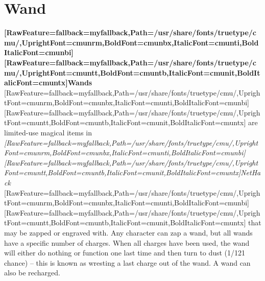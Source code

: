 \chapter{Wand}

{\bfseries \allowbreak{}\setmainfont{cmunbx.ttf}[RawFeature={fallback=myfallback},Path=/usr/share/fonts/truetype/cmu/,UprightFont=cmunrm,BoldFont=cmunbx,ItalicFont=cmunti,BoldItalicFont=cmunbi]\setmonofont{cmunbx.ttf}[RawFeature={fallback=myfallback},Path=/usr/share/fonts/truetype/cmu/,UprightFont=cmuntt,BoldFont=cmuntb,ItalicFont=cmunit,BoldItalicFont=cmuntx]\bfseries Wands}{$\text{ }$}\allowbreak{}\setmainfont{cmunrm.ttf}[RawFeature={fallback=myfallback},Path=/usr/share/fonts/truetype/cmu/,UprightFont=cmunrm,BoldFont=cmunbx,ItalicFont=cmunti,BoldItalicFont=cmunbi]\setmonofont{cmunrm.ttf}[RawFeature={fallback=myfallback},Path=/usr/share/fonts/truetype/cmu/,UprightFont=cmuntt,BoldFont=cmuntb,ItalicFont=cmunit,BoldItalicFont=cmuntx] are limited-{}use magical items in {\itshape \allowbreak{}\setmainfont{cmunti.ttf}[RawFeature={fallback=myfallback},Path=/usr/share/fonts/truetype/cmu/,UprightFont=cmunrm,BoldFont=cmunbx,ItalicFont=cmunti,BoldItalicFont=cmunbi]\setmonofont{cmunti.ttf}[RawFeature={fallback=myfallback},Path=/usr/share/fonts/truetype/cmu/,UprightFont=cmuntt,BoldFont=cmuntb,ItalicFont=cmunit,BoldItalicFont=cmuntx]\itshape NetHack\footnotemark[17]}{$\text{ }$}\allowbreak{}\setmainfont{cmunrm.ttf}[RawFeature={fallback=myfallback},Path=/usr/share/fonts/truetype/cmu/,UprightFont=cmunrm,BoldFont=cmunbx,ItalicFont=cmunti,BoldItalicFont=cmunbi]\setmonofont{cmunrm.ttf}[RawFeature={fallback=myfallback},Path=/usr/share/fonts/truetype/cmu/,UprightFont=cmuntt,BoldFont=cmuntb,ItalicFont=cmunit,BoldItalicFont=cmuntx] that may be zapped\footnotemark[18] or engraved\footnotemark[19] with. Any character can zap a wand, but all wands have a specific number of charges. When all charges have been used, the wand will either do nothing or function one last time and then turn to dust (1/121 chance) – this is known as wresting\footnotemark[20] a last charge out of the wand. A wand can also be recharged\footnotemark[21].


